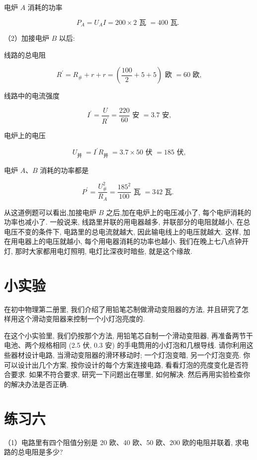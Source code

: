 \documentclass[10pt]{article}
\begin{document}
电炉 \(A\) 消耗的功率

\[
{P}_{A} = {U}_{A}I = {200} \times 2\text{ 瓦 } = {400}\text{ 瓦. }
\]

（2）加接电炉 \(B\) 以后:

线路的总电阻

\[
{R}^{\prime } = {R}_{\# } + r + r = \left( {\frac{100}{2} + 5 + 5}\right) \text{ 欧 } = {60}\text{ 欧,}
\]

线路中的电流强度

\[
{I}^{\prime } = \frac{U}{{R}^{\prime }} = \frac{220}{60}\text{ 安 } = {3.7}\text{ 安,}
\]

电炉上的电压

\[
{U}_{\text{并 }} = {I}^{\prime }{R}_{\text{并 }} = {3.7} \times {50}\text{ 伏 } = {185}\text{ 伏,}
\]

电炉 \(A\text{、}B\) 消耗的功率都是

\[
{P}^{\prime } = \frac{{U}_{\#}^{2}}{{R}_{A}} = \frac{{185}^{2}}{100}\text{ 瓦 } = {342}\text{ 瓦. }
\]

从这道例题可以看出,加接电炉 \(B\) 之后,加在电炉上的电压减小了, 每个电炉消耗的功率也减小了. 一般说来, 线路里并联的用电器越多, 并联部分的电阻就越小, 在总电压不变的条件下, 电路里的总电流就越大, 因此输电线上的电压就越大. 这样, 加在用电器上的电压就越小, 每个用电器消耗的功率也越小. 我们在晚上七八点钟开灯, 那时大家都用电灯照明, 电灯比深夜时暗些, 就是这个缘故.

\section*{小实验}

在初中物理第二册里, 我们介绍了用铅笔芯制做滑动变阻器的方法, 并且研究了怎样用这个滑动变阻器来控制一个小灯泡亮度的.

在这个小实验里, 我们仍按那个方法, 用铅笔芯自制一个滑动变阻器, 再准备两节干电池、两个规格相同 (2.5 伏, 0.3 安) 的手电筒用的小灯泡和几根导线. 请你利用这些器材设计电路, 当滑动变阻器的滑环移动时; 一个灯泡变暗, 另一个灯泡变亮. 你可以设计出几个方案, 按你设计的每个方案连接电路, 看看灯泡的亮度变化是否符合要求. 如果不符合要求, 研究一下问题出在哪里, 如何解决. 然后再用实验检查你的解决办法是否正确.

\section*{练习六}

（1）电路里有四个阻值分别是 20 欧、40 欧、50 欧、200 欧的电阻并联着, 求电路的总电阻是多少?
\end{document}
